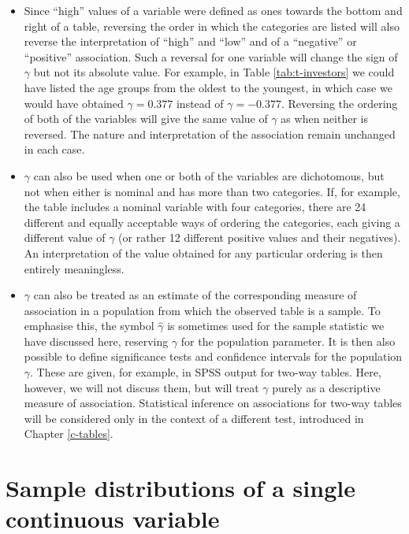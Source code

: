 \documentclass[11pt,a4paper,openany]{book}
\begin{document}
\begin{itemize}
\item
  Since ``high'' values of a variable were defined as ones towards the
  bottom and right of a table, reversing the order in which the
  categories are listed will also reverse the interpretation of ``high''
  and ``low'' and of a ``negative'' or ``positive'' association. Such a
  reversal for one variable will change the sign of \(\gamma\) but not
  its absolute value. For example, in Table \ref{tab:t-investors} we
  could have listed the age groups from the oldest to the youngest, in
  which case we would have obtained \(\gamma=0.377\) instead of
  \(\gamma=-0.377\). Reversing the ordering of both of the variables
  will give the same value of \(\gamma\) as when neither is reversed.
  The nature and interpretation of the association remain unchanged in
  each case.
\item
  \(\gamma\) can also be used when one or both of the variables are
  dichotomous, but not when either is nominal and has more than two
  categories. If, for example, the table includes a nominal variable
  with four categories, there are 24 different and equally acceptable
  ways of ordering the categories, each giving a different value of
  \(\gamma\) (or rather 12 different positive values and their
  negatives). An interpretation of the value obtained for any particular
  ordering is then entirely meaningless.
\item
  \(\gamma\) can also be treated as an estimate of the corresponding
  measure of association in a population from which the observed table
  is a sample. To emphasise this, the symbol \(\hat{\gamma}\) is
  sometimes used for the sample statistic we have discussed here,
  reserving \(\gamma\) for the population parameter. It is then also
  possible to define significance tests and confidence intervals for the
  population \(\gamma\). These are given, for example, in SPSS output
  for two-way tables. Here, however, we will not discuss them, but will
  treat \(\gamma\) purely as a descriptive measure of association.
  Statistical inference on associations for two-way tables will be
  considered only in the context of a different test, introduced in
  Chapter \ref{c-tables}.
\end{itemize}

\section{Sample distributions of a single continuous
variable}\label{s-descr1-1cont}
\end{document}
